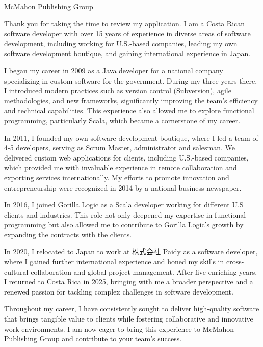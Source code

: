 \documentclass[10.5pt]{letter}
\date{\today}
\newcommand{\companyName}{McMahon Publishing Group}
\begin{document}
\begin{letter}{
    \companyName
}

\opening{}

\par
Thank you for taking the time to review my application. I am a Costa Rican software developer with over 15 years of experience in diverse areas of software development, including working for U.S.-based companies, leading my own software development boutique, and gaining international experience in Japan.

\par
I began my career in 2009 as a Java developer for a national company specializing in custom software for the government. During my three years there, I introduced modern practices such as version control (Subversion), agile methodologies, and new frameworks, significantly improving the team's efficiency and technical capabilities. This experience also allowed me to explore functional programming, particularly Scala, which became a cornerstone of my career.

\par
In 2011, I founded my own software development boutique, where I led a team of 4-5 developers, serving as Scrum Master, administrator and salesman. We delivered custom web applications for clients, including U.S.-based companies, which provided me with invaluable experience in remote collaboration and exporting services internationally. My efforts to promote innovation and entrepreneurship were recognized in 2014 by a national business newspaper.

\par
In 2016, I joined Gorilla Logic as a Scala developer working for different U.S clients and industries. This role not only deepened my expertise in functional programming but also allowed me to contribute to Gorilla Logic's growth by expanding the contracts with the clients.

\par
In 2020, I relocated to Japan to work at 株式会社 Paidy as a software developer, where I gained further international experience and honed my skills in cross-cultural collaboration and global project management. After five enriching years, I returned to Costa Rica in 2025, bringing with me a broader perspective and a renewed passion for tackling complex challenges in software development.

\par
Throughout my career, I have consistently sought to deliver high-quality software that brings tangible value to clients while fostering collaborative and innovative work environments. I am now eager to bring this experience to \companyName{} and contribute to your team's success.


\end{letter}
\end{document}
